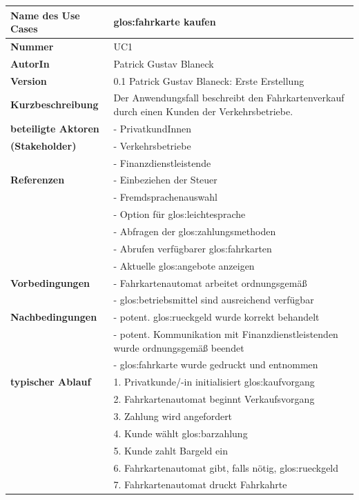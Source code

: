 \documentclass{lastenheft}
\begin{document}
\begin{xltabular}{\linewidth}{|>{\bfseries}p{4cm}|X|}
    \hline
    Name des Use Cases & \gls{glos:fahrkarte} kaufen \\
    \hline
    Nummer & UC1 \\
    \hline
    AutorIn & Patrick Gustav Blaneck \\
    \hline
    Version & 0.1 Patrick Gustav Blaneck: Erste Erstellung \\
    \hline
    Kurzbeschreibung & Der Anwendungsfall beschreibt den Fahrkartenverkauf durch einen Kunden der Verkehrsbetriebe.\\
    \hline
    beteiligte Aktoren & - PrivatkundInnen \\
    (Stakeholder) & - Verkehrsbetriebe \\
    & - Finanzdienstleistende \\
    \hline
    Referenzen & - Einbeziehen der Steuer \\
    & - Fremdsprachenauswahl \\
    & - Option für \gls{glos:leichtesprache} \\
    & - Abfragen der \gls{glos:zahlungsmethode}n \\
    & - Abrufen verfügbarer \gls{glos:fahrkarte}n \\
    & - Aktuelle \gls{glos:angebot}e anzeigen \\
    \hline
    Vorbedingungen & - Fahrkartenautomat arbeitet ordnungsgemäß \\
    & - \gls{glos:betriebsmittel} sind ausreichend verfügbar \\
    \hline
    Nachbedingungen & - potent. \gls{glos:rueckgeld} wurde korrekt behandelt \\
    & - potent. Kommunikation mit Finanzdienstleistenden wurde ordnungsgemäß beendet \\
    & - \gls{glos:fahrkarte} wurde gedruckt und entnommen \\
    \hline
    typischer Ablauf & 1. Privatkunde/-in initialisiert \gls{glos:kaufvorgang} \\
    & 2. Fahrkartenautomat beginnt Verkaufsvorgang \\
    & 3. Zahlung wird angefordert \\
    & 4. Kunde wählt \gls{glos:barzahlung} \\
    & 5. Kunde zahlt Bargeld ein \\
    & 6. Fahrkartenautomat gibt, falls nötig, \gls{glos:rueckgeld} \\
    & 7. Fahrkartenautomat druckt Fahrkahrte \\

\end{xltabular}
\end{document}
